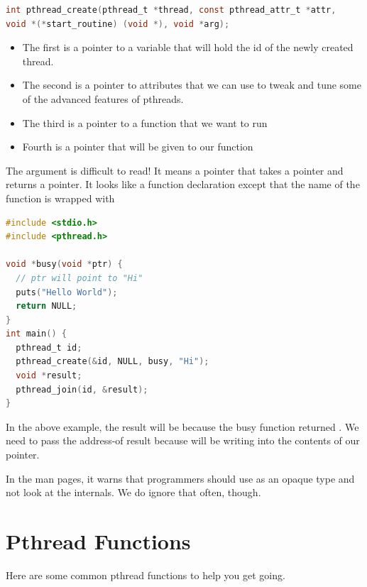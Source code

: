 \begin{lstlisting}[language=C]
int pthread_create(pthread_t *thread, const pthread_attr_t *attr,
void *(*start_routine) (void *), void *arg);
\end{lstlisting}

\begin{itemize}
\tightlist
\item
  The first is a pointer to a variable that will hold the id of the newly created thread.
\item
  The second is a pointer to attributes that we can use to tweak and tune some of the advanced features of pthreads.
\item
  The third is a pointer to a function that we want to run
\item
  Fourth is a pointer that will be given to our function
\end{itemize}

The argument  is difficult to read!
It means a pointer that takes a  pointer and returns a  pointer.
It looks like a function declaration except that the name of the function is wrapped with 

\begin{lstlisting}[language=C]
#include <stdio.h>
#include <pthread.h>

void *busy(void *ptr) {
  // ptr will point to "Hi"
  puts("Hello World");
  return NULL;
}
int main() {
  pthread_t id;
  pthread_create(&id, NULL, busy, "Hi");
  void *result;
  pthread_join(id, &result);
}
\end{lstlisting}

In the above example, the result will be  because the busy function returned .
We need to pass the address-of result because  will be writing into the contents of our pointer.

In the man pages, it warns that programmers should use  as an opaque type and not look at the internals.
We do ignore that often, though.

\section{Pthread Functions}

Here are some common pthread functions to help you get going.

